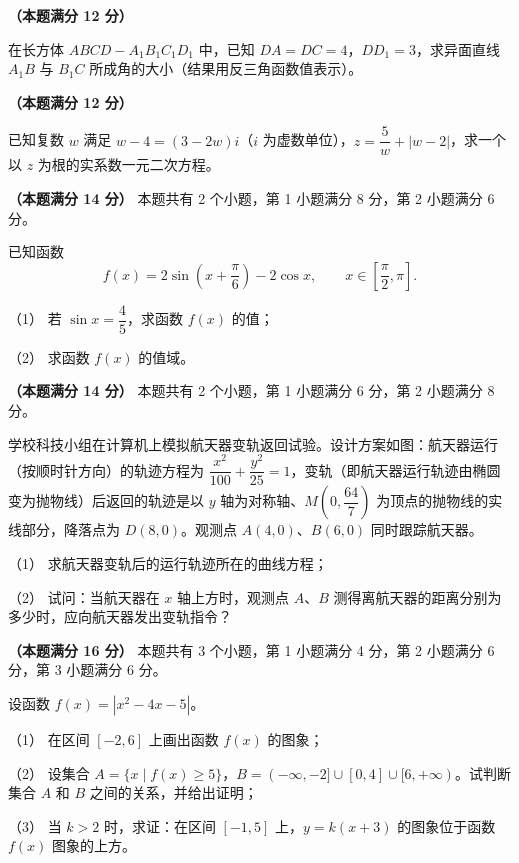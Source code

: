 \Needspace{0.4\textheight}
\begin{question}
\textbf{（本题满分 12 分）} 

在长方体 $ABCD-A_1B_1C_1D_1$ 中，已知 $DA=DC=4$，$DD_1=3$，求异面直线 $A_1B$ 与 $B_1C$ 所成角的大小（结果用反三角函数值表示）。
\nopagebreak[4]
\begin{center}\end{center}
\nopagebreak[4]
\end{question}
\begin{question}
\textbf{（本题满分 12 分）} 

已知复数 $w$ 满足 $w-4=(3-2w)i$（$i$ 为虚数单位），$z=\dfrac5w+|w-2|$，求一个以 $z$ 为根的实系数一元二次方程。

\end{question}
\begin{question}
\textbf{（本题满分 14 分）} 本题共有 2 个小题，第 1 小题满分 8 分，第 2 小题满分 6 分。

已知函数
\nopagebreak[4]
\[
f(x)=2\sin\left(x+\frac\pi6\right)-2\cos x,\qquad x\in\left[\frac\pi2,\pi\right].
\]

（1） 若 $\sin x=\dfrac45$，求函数 $f(x)$ 的值；

（2） 求函数 $f(x)$ 的值域。

\Needspace{0.4\textheight}
\end{question}
\begin{question}
\textbf{（本题满分 14 分）} 本题共有 2 个小题，第 1 小题满分 6 分，第 2 小题满分 8 分。

学校科技小组在计算机上模拟航天器变轨返回试验。设计方案如图：航天器运行（按顺时针方向）的轨迹方程为 $\dfrac{x^2}{100}+\dfrac{y^2}{25}=1$，变轨（即航天器运行轨迹由椭圆变为抛物线）后返回的轨迹是以 $y$ 轴为对称轴、$M\left(0,\dfrac{64}{7}\right)$ 为顶点的抛物线的实线部分，降落点为 $D(8,0)$。观测点 $A(4,0)\text{、}B(6,0)$ 同时跟踪航天器。
\nopagebreak[4]
\begin{center}\end{center}
\nopagebreak[4]
（1） 求航天器变轨后的运行轨迹所在的曲线方程；

（2） 试问：当航天器在 $x$ 轴上方时，观测点 $A\text{、}B$ 测得离航天器的距离分别为多少时，应向航天器发出变轨指令？

\Needspace{0.4\textheight}
\end{question}
\begin{question}
\textbf{（本题满分 16 分）} 本题共有 3 个小题，第 1 小题满分 4 分，第 2 小题满分 6 分，第 3 小题满分 6 分。

设函数 $f(x)=|x^2-4x-5|$。

（1） 在区间 $[-2,6]$ 上画出函数 $f(x)$ 的图象；

（2） 设集合 $A=\{x\mid f(x)\geq5\}$，$B=(-\infty,-2]\cup[0,4]\cup[6,+\infty)$。试判断集合 $A$ 和 $B$ 之间的关系，并给出证明；

（3） 当 $k>2$ 时，求证：在区间 $[-1,5]$ 上，$y=k(x+3)$ 的图象位于函数 $f(x)$ 图象的上方。
\nopagebreak[4]
\begin{center}\end{center}
\nopagebreak[4]
\end{question}
